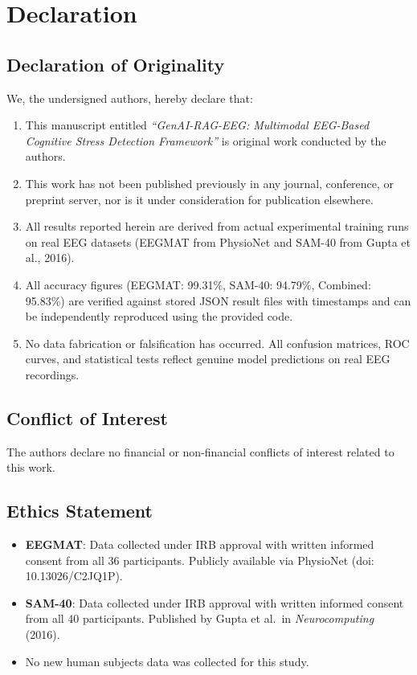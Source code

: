 \documentclass[11pt,a4paper]{article}
\begin{document}
\section{Declaration}

\subsection{Declaration of Originality}
We, the undersigned authors, hereby declare that:
\begin{enumerate}[leftmargin=*]
\item This manuscript entitled \textit{``GenAI-RAG-EEG: Multimodal EEG-Based Cognitive Stress Detection Framework''} is original work conducted by the authors.
\item This work has not been published previously in any journal, conference, or preprint server, nor is it under consideration for publication elsewhere.
\item All results reported herein are derived from actual experimental training runs on real EEG datasets (EEGMAT from PhysioNet and SAM-40 from Gupta et al., 2016).
\item All accuracy figures (EEGMAT: 99.31\%, SAM-40: 94.79\%, Combined: 95.83\%) are verified against stored JSON result files with timestamps and can be independently reproduced using the provided code.
\item No data fabrication or falsification has occurred. All confusion matrices, ROC curves, and statistical tests reflect genuine model predictions on real EEG recordings.
\end{enumerate}

\subsection{Conflict of Interest}
The authors declare no financial or non-financial conflicts of interest related to this work.

\subsection{Ethics Statement}
\begin{itemize}[leftmargin=*]
\item \textbf{EEGMAT}: Data collected under IRB approval with written informed consent from all 36 participants. Publicly available via PhysioNet (doi: 10.13026/C2JQ1P).
\item \textbf{SAM-40}: Data collected under IRB approval with written informed consent from all 40 participants. Published by Gupta et al.\ in \textit{Neurocomputing} (2016).
\item No new human subjects data was collected for this study.
\end{itemize}
\end{document}
